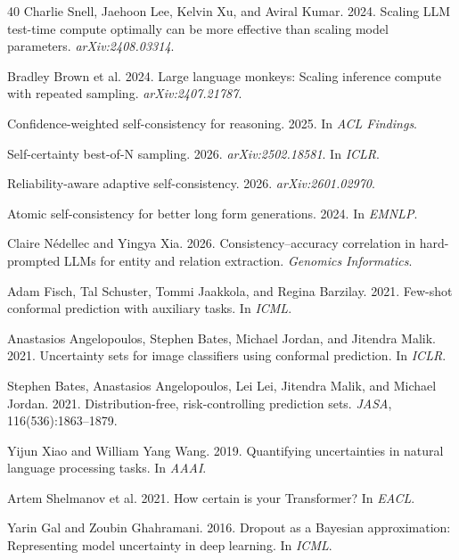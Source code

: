 \documentclass[11pt,a4paper]{article}
\begin{document}
\begin{thebibliography}{40}
Charlie Snell, Jaehoon Lee, Kelvin Xu, and Aviral Kumar. 2024.
Scaling {LLM} test-time compute optimally can be more effective than scaling model parameters.
\emph{arXiv:2408.03314}.

Bradley Brown et al. 2024.
Large language monkeys: Scaling inference compute with repeated sampling.
\emph{arXiv:2407.21787}.

Confidence-weighted self-consistency for reasoning. 2025.
In \emph{ACL Findings}.

Self-certainty best-of-{N} sampling. 2026.
\emph{arXiv:2502.18581}. In \emph{ICLR}.

Reliability-aware adaptive self-consistency. 2026.
\emph{arXiv:2601.02970}.

Atomic self-consistency for better long form generations. 2024.
In \emph{EMNLP}.

Claire N\'{e}dellec and Yingya Xia. 2026.
Consistency--accuracy correlation in hard-prompted {LLMs} for entity and relation extraction.
\emph{Genomics Informatics}.

Adam Fisch, Tal Schuster, Tommi Jaakkola, and Regina Barzilay. 2021.
Few-shot conformal prediction with auxiliary tasks.
In \emph{ICML}.

Anastasios Angelopoulos, Stephen Bates, Michael Jordan, and Jitendra Malik. 2021.
Uncertainty sets for image classifiers using conformal prediction.
In \emph{ICLR}.

Stephen Bates, Anastasios Angelopoulos, Lei Lei, Jitendra Malik, and Michael Jordan. 2021.
Distribution-free, risk-controlling prediction sets.
\emph{JASA}, 116(536):1863--1879.

Yijun Xiao and William Yang Wang. 2019.
Quantifying uncertainties in natural language processing tasks.
In \emph{AAAI}.

Artem Shelmanov et al. 2021.
How certain is your {Transformer}?
In \emph{EACL}.

Yarin Gal and Zoubin Ghahramani. 2016.
Dropout as a {Bayesian} approximation: Representing model uncertainty in deep learning.
In \emph{ICML}.


\end{thebibliography}
\end{document}
